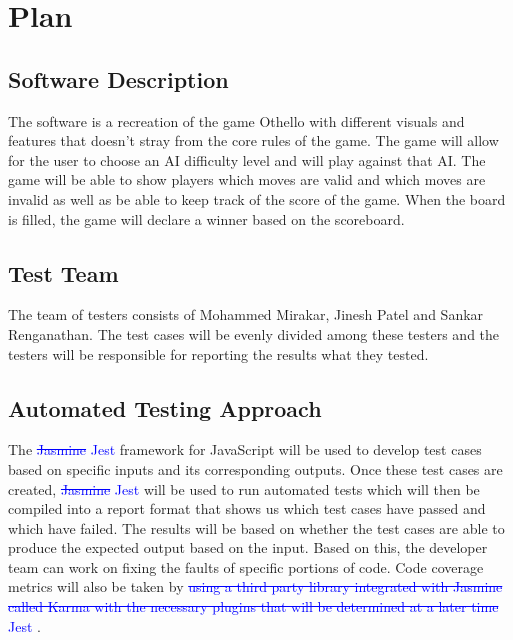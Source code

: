 \documentclass[12pt, titlepage]{article}
\begin{document}
\section{Plan}

\subsection{Software Description}
The software is a recreation of the game Othello with different visuals and features that doesn’t stray from the core rules of the game. The game will allow for the user to choose an AI difficulty level and will play against that AI. The game will be able to show players which moves are valid and which moves are invalid as well as be able to keep track of the score of the game. When the board is filled, the game will declare a winner based on the scoreboard.

\subsection{Test Team}
The team of testers consists of Mohammed Mirakar, Jinesh Patel and Sankar Renganathan. The test cases will be evenly divided among these testers and the testers will be responsible for reporting the results what they tested.

\subsection{Automated Testing Approach}
The \textcolor{blue}{\sout{Jasmine} Jest} framework for JavaScript will be used to develop test cases based on specific inputs and its corresponding outputs. Once these test cases are created, \textcolor{blue}{\sout{Jasmine} Jest} will be used to run automated tests which will then be compiled into a report format that shows us which test cases have passed and which have failed. The results will be based on whether the test cases are able to produce the expected output based on the input. Based on this, the developer team can work on fixing the faults of specific portions of code. Code coverage metrics will also be taken by \textcolor{blue}{\sout{using a third party library integrated with Jasmine called Karma with the necessary plugins that will be determined at a later time} Jest} .
\end{document}
